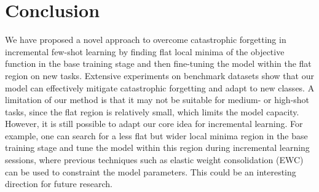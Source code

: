 \documentclass{article}
\begin{document}
\begin{table*}[t]
\renewcommand\arraystretch{1.0}
\caption{Study of the flat region bound  for 5-way 5-shot incremental learning on CIFAR-100. The top 3 results in each row are in boldface.} 
\label{tab:bound}
\centering
{}
\end{table*} 




 \section{Conclusion}\label{sec:conclusion}
 We have proposed a novel approach to overcome catastrophic forgetting in incremental few-shot learning by finding flat local minima of the objective function in the base training stage and then fine-tuning the model within the flat region on new tasks. Extensive experiments on benchmark datasets show that our model can effectively mitigate catastrophic forgetting and adapt to new classes.
 A limitation of our method is that it may not be suitable for medium- or high-shot tasks, since the flat region is relatively small, which limits the model capacity. However, it is still possible to adapt our core idea for incremental learning. For example, one can search for a less flat but wider local minima region in the base training stage and tune the model within this region during incremental learning sessions, where previous techniques such as elastic weight consolidation (EWC)~\citep{kirkpatrick2017overcoming} can be used to constraint the model parameters. This could be an interesting direction for future research.
\end{document}
